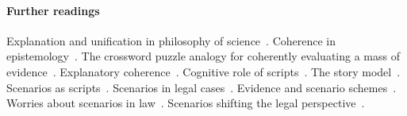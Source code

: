 \documentclass[10pt]{article}
\begin{document}

%
%



\paragraph{Further readings}

Explanation and unification in philosophy of science~\citep{friedman1974}. 
Coherence in epistemology~\citep{bonjour1985}.
The crossword puzzle analogy for coherently evaluating a mass of evidence~\citep{haack2008}.
Explanatory coherence~\citep{thagard2001}.
Cognitive role of scripts~\citep{schankAbelson1977}.
The story model~\citep{penningtonHastie1993StoryModel}. 
Scenarios as scripts~\citep{wagenaarEtal1993}.
Scenarios in legal cases~\citep{griffin2013}. 
Evidence and scenario schemes~\citep{bex2011,verheijEtal2016,vlekEtal2016}.
Worries about scenarios in law~\citep{velleman2003}.
Scenarios shifting the legal perspective~\citep{bexVerheij2013}.
\end{document}
